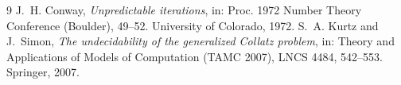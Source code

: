 \documentclass[11pt]{amsart}
\begin{document}
\begin{thebibliography}{9}
 J.~H. Conway, \emph{Unpredictable iterations}, in: Proc. 1972 Number Theory Conference (Boulder), 49--52. University of Colorado, 1972.
 S.~A. Kurtz and J.~Simon, \emph{The undecidability of the generalized Collatz problem}, in: Theory and Applications of Models of Computation (TAMC 2007), LNCS 4484, 542--553. Springer, 2007.
\end{thebibliography}
\end{document}
